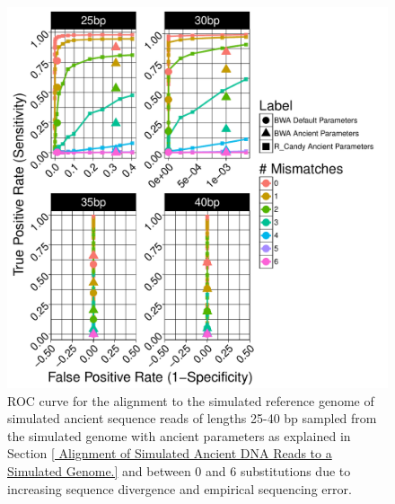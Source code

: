 \documentclass[11pt,a4paper]{report}
\begin{document}
\begin{figure}[H]
\centering
\includegraphics[width=12cm]{pictures/f_DS1_ART.pdf}
\caption{
ROC curve for the alignment to the simulated reference genome of simulated ancient 
sequence reads of lengths 25-40 bp sampled from the simulated genome with ancient 
parameters as explained in Section \ref{ Alignment of Simulated Ancient DNA Reads to a Simulated Genome.} 
and between 0 and 6 substitutions due to increasing sequence divergence and
empirical sequencing error.
}
\label{DS1_ART}
\end{figure}
\end{document}
